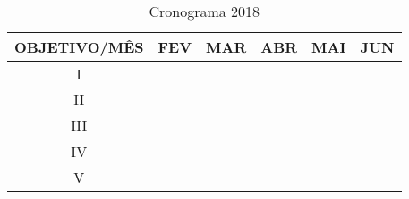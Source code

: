 \documentclass[
	12pt,				%
	openright,			%
	oneside,			%
	a4paper,			%
	english,			%
	french,				%
	spanish,			%
	brazil,				%
	]{abntex2}
\begin{document}
	\begin{table}[h!]
	\centering
	\caption{Cronograma 2018}
	\label{my-label}
	\begin{tabular}{|c|c|c|c|c|c|}
		\hline
		OBJETIVO/MÊS & FEV & MAR & ABR & MAI & JUN \\ \hline
		I &  & & & & \\ \hline
		II &  & & & & \\ \hline
		III &  & & & & \\ \hline
		IV &  & & & & \\ \hline
		V &  & & & & \\ \hline
	\end{tabular}
\end{table}


\end{document}
